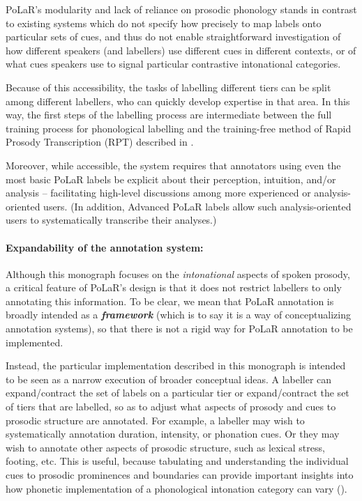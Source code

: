PoLaR’s modularity and lack of reliance on prosodic phonology stands in contrast to existing systems which do not specify how precisely to map labels onto particular sets of cues, and thus do not enable straightforward investigation of how different speakers (and labellers) use different cues in different contexts, or of what cues speakers use to signal particular contrastive intonational categories.

Because of this accessibility, the tasks of labelling different tiers can be split among different labellers, who can quickly develop expertise in that area.  In this way, the first steps of the labelling process are intermediate between the full training process for phonological labelling and the training-free method of Rapid Prosody Transcription (RPT) described in \citet{cole-14, cole-17}. 

Moreover, while accessible, the system requires that annotators using even the most basic PoLaR labels be explicit about their perception, intuition, and/or analysis – facilitating high-level discussions among more experienced or analysis-oriented users. (In addition, Advanced PoLaR labels allow such analysis-oriented users to systematically transcribe their analyses.)

\paragraph{Expandability of the annotation system:}
Although this monograph focuses on the \emph{intonational} aspects of spoken prosody, a critical feature of PoLaR’s design is that it does not restrict labellers to only annotating this information. To be clear, we mean that PoLaR annotation is broadly intended as a \emph{\textbf{framework}} (which is to say it is a way of conceptualizing annotation systems), so that there is not a rigid way for PoLaR annotation to be implemented. 

Instead, the particular implementation described in this monograph is intended to be seen as a narrow execution of broader conceptual ideas. A labeller can expand\slash contract the set of labels on a particular tier or expand\slash contract the set of tiers that are labelled, so as to adjust what aspects of prosody and cues to prosodic structure are annotated. For example, a labeller may wish to systematically annotation duration, intensity, or phonation cues. Or they may wish to annotate other aspects of prosodic structure, such as lexical stress, footing, etc. This is useful, because tabulating and understanding the individual cues to prosodic prominences and boundaries can provide important insights into how phonetic implementation of a phonological intonation category can vary (\citealt{brugos15, brugos-18}).

